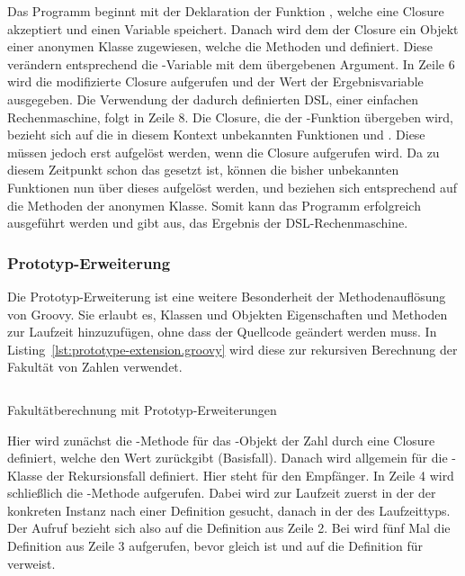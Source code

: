\documentclass[a4paper]{article}
\newcommand{\codelisting}[3]{
\begin{listing}[ht]
	\inputminted{#1}{#1/#2}
	\caption{#3}
	\label{lst:#2}
\end{listing}
}
\begin{document}
Das Programm beginnt mit der Deklaration der Funktion , welche eine Closure akzeptiert und einen Variable  speichert.
Danach wird dem  der Closure ein Objekt einer anonymen Klasse zugewiesen, welche die Methoden  und  definiert.
Diese verändern entsprechend die -Variable mit dem übergebenen Argument.
In Zeile 6 wird die modifizierte Closure aufgerufen und der Wert der Ergebnisvariable ausgegeben.
Die Verwendung der dadurch definierten DSL, einer einfachen Rechenmaschine, folgt in Zeile 8.
Die Closure, die der -Funktion übergeben wird, bezieht sich auf die in diesem Kontext unbekannten Funktionen  und .
Diese müssen jedoch erst aufgelöst werden, wenn die Closure aufgerufen wird.
Da zu diesem Zeitpunkt schon das  gesetzt ist, können die bisher unbekannten Funktionen nun über dieses aufgelöst werden, und beziehen sich entsprechend auf die Methoden der anonymen Klasse.
Somit kann das Programm erfolgreich ausgeführt werden und gibt  aus, das Ergebnis der DSL-Rechenmaschine.

\subsubsection{Prototyp-Erweiterung}

Die Prototyp-Erweiterung ist eine weitere Besonderheit der Methodenauflösung von Groovy.
Sie erlaubt es, Klassen und Objekten Eigenschaften und Methoden zur Laufzeit hinzuzufügen, ohne dass der Quellcode geändert werden muss.
In Listing~\ref{lst:prototype-extension.groovy} wird diese zur rekursiven Berechnung der Fakultät von Zahlen verwendet.

\codelisting{groovy}{prototype-extension.groovy}{Fakultätberechnung mit Prototyp-Erweiterungen}

Hier wird zunächst die -Methode für das -Objekt der Zahl  durch eine Closure definiert, welche den Wert  zurückgibt (Basisfall).
Danach wird allgemein für die -Klasse der Rekursionsfall definiert.
Hier steht  für den Empfänger.
In Zeile 4 wird schließlich die -Methode aufgerufen.
Dabei wird zur Laufzeit zuerst in der  der konkreten Instanz nach einer Definition gesucht, danach in der  des Laufzeittyps.
Der Aufruf  bezieht sich also auf die Definition aus Zeile 2.
Bei  wird fünf Mal die Definition aus Zeile 3 aufgerufen, bevor  gleich  ist und  auf die Definition für  verweist.
\end{document}
